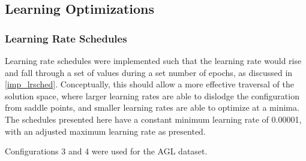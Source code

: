 \documentclass[a4paper,latin]{paper}
\begin{document}



\subsection{Learning Optimizations}

\subsubsection{Learning Rate Schedules}

Learning rate schedules were implemented such that the learning rate would rise and fall through a set of values during a set number of epochs, as discussed in \ref{imp_lrsched}.	Conceptually, this should allow a more effective traversal of the solution space, where larger learning rates are able to dislodge the configuration from saddle points, and smaller learning rates are able to optimize at a minima. The schedules presented here have a constant minimum learning rate of 0.00001, with an adjusted maximum learning rate as presented. \newline

Configurations 3 and 4 were used for the AGL dataset. 
\end{document}
